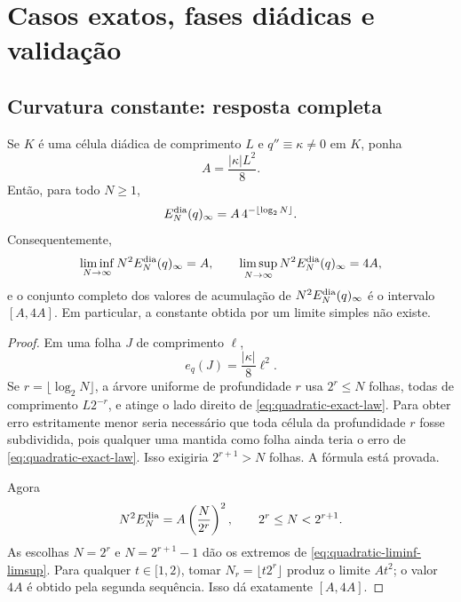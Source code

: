 \section{Casos exatos, fases diádicas e validação}
\label{sec:dyadic-exact-cases}

\subsection{Curvatura constante: resposta completa}

\begin{theorem}
\label{thm:quadratic-dyadic-constant}
Se $K$ é uma célula diádica de comprimento $L$ e
$q''\equiv\kappa\ne0$ em $K$, ponha
\begin{equation}
 A=\frac{|\kappa|L^2}{8}.
 \label{eq:quadratic-A}
\end{equation}
Então, para todo $N\ge1$,
\begin{equation}
 E_N^{\rm dia}(q)_\infty
 =A\,4^{-\lfloor\log_2N\rfloor}.
 \label{eq:quadratic-exact-law}
\end{equation}
Consequentemente,
\begin{equation}
 \liminf_{N\to\infty}N^2E_N^{\rm dia}(q)_\infty=A,
 \qquad
 \limsup_{N\to\infty}N^2E_N^{\rm dia}(q)_\infty=4A,
 \label{eq:quadratic-liminf-limsup}
\end{equation}
e o conjunto completo dos valores de acumulação de
$N^2E_N^{\rm dia}(q)_\infty$ é o intervalo $[A,4A]$. Em particular, a
constante obtida por um limite simples não existe.
\end{theorem}

\begin{proof}
Em uma folha $J$ de comprimento $\ell$,
\begin{equation}
 e_q(J)=\frac{|\kappa|}{8}\ell^2.
 \label{eq:quadratic-local-exact}
\end{equation}
Se $r=\lfloor\log_2N\rfloor$, a árvore uniforme de profundidade $r$ usa
$2^r\le N$ folhas, todas de comprimento $L2^{-r}$, e atinge o lado direito
de \eqref{eq:quadratic-exact-law}. Para obter erro estritamente menor seria
necessário que toda célula da profundidade $r$ fosse subdividida, pois
qualquer uma mantida como folha ainda teria o erro de
\eqref{eq:quadratic-exact-law}. Isso exigiria $2^{r+1}>N$ folhas. A fórmula
está provada.

Agora
\[
 N^2E_N^{\rm dia}=A\left(\frac{N}{2^r}\right)^2,
 \qquad 2^r\le N<2^{r+1}.
\]
As escolhas $N=2^r$ e $N=2^{r+1}-1$ dão os extremos de
\eqref{eq:quadratic-liminf-limsup}. Para qualquer $t\in[1,2)$, tomar
$N_r=\lfloor t2^r\rfloor$ produz o limite $At^2$; o valor $4A$ é obtido
pela segunda sequência. Isso dá exatamente $[A,4A]$.
\end{proof}

